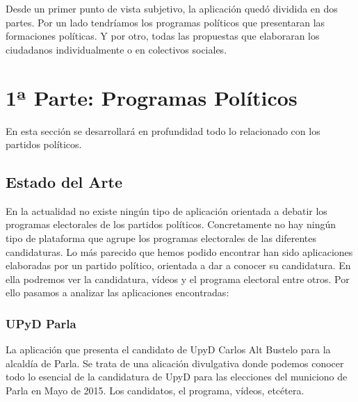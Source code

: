 Desde un primer punto de vista subjetivo, la aplicación quedó dividida en dos partes. Por un lado tendríamos los programas políticos que presentaran las formaciones políticas. Y por otro, todas las propuestas que elaboraran los ciudadanos individualmente o en colectivos sociales.

\section{1ª Parte: Programas Políticos}
En esta sección se desarrollará en profundidad todo lo relacionado con los partidos políticos.

  \subsection{Estado del Arte}
En la actualidad no existe ningún tipo de aplicación orientada a debatir los programas electorales de los partidos políticos. Concretamente no hay ningún tipo de plataforma que agrupe los programas electorales de las diferentes candidaturas.
Lo más parecido que hemos podido encontrar han sido aplicaciones elaboradas por un partido político, orientada a dar a conocer su candidatura. En ella podremos ver la candidatura, vídeos y el programa electoral entre otros. Por ello pasamos a analizar las aplicaciones encontradas:

	\subsubsection{UPyD Parla}\label{sssec:UPyDParla}
La aplicación que presenta el candidato de UpyD Carlos Alt Bustelo para la alcaldía de Parla. Se trata de una alicación divulgativa donde podemos conocer todo lo esencial de la candidatura de UpyD para las elecciones del municiono de Parla en Mayo de 2015. Los candidatos, el programa, vídeos, etcétera.

